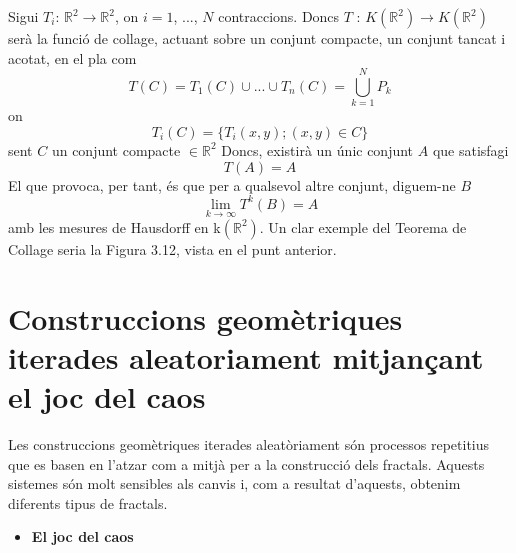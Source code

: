 \documentclass[12pt]{report}
\begin{document}
Sigui $T_i$: $\mathbb{R}^2 \rightarrow \mathbb{R}^2$, on $i = 1$, ..., $N$ contraccions. Doncs $T$ : $K(\mathbb{R}^2) \rightarrow K(\mathbb{R}^2)$ serà la funció de collage, actuant sobre un conjunt compacte, un conjunt tancat i acotat, en el pla com
$$T(C) = T_1(C) \cup ... \cup T_n(C) = \bigcup_{k=1}^{N}P_k$$
on
$$T_i(C) = \{T_i(x,y); (x,y) \in C\}$$
sent 
$C$ un conjunt compacte $\in \mathbb{R}^2$
\newline
Doncs, existirà un únic conjunt $A$ que satisfagi
$$T(A) = A$$
El que provoca, per tant, és que per a qualsevol altre conjunt, diguem-ne $B$
$$\lim\limits_{k\to\infty} T^k(B) = A$$
amb les mesures de Hausdorff en k$(\mathbb{R}^2)$.
\newline
Un clar exemple del Teorema de Collage seria la Figura 3.12, vista en el punt anterior.
\section{Construccions geomètriques iterades aleatoriament mitjançant el joc del caos}
Les construccions geomètriques iterades aleatòriament són processos repetitius que es basen en l'atzar com a mitjà per a la construcció dels fractals. Aquests sistemes són molt sensibles als canvis i, com a resultat d'aquests, obtenim diferents tipus de fractals.
\begin{itemize}
    \item \textbf{El joc del caos}
\end{itemize} 
\end{document}
